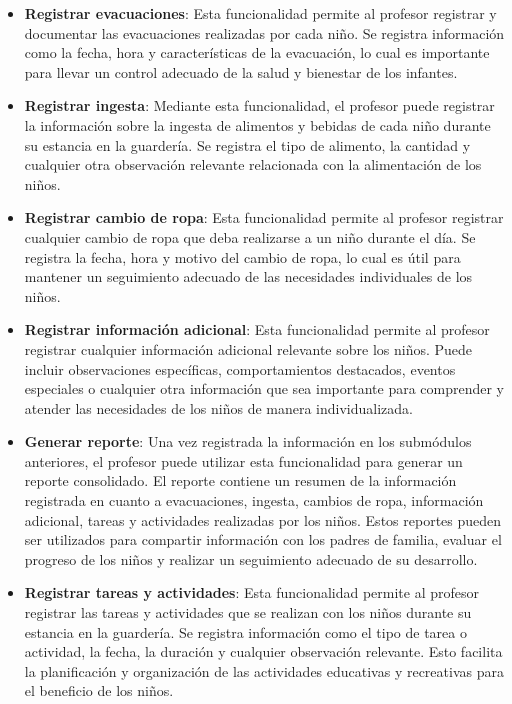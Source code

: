 \begin{itemize}
\item \textbf{Registrar evacuaciones}: Esta funcionalidad permite al profesor registrar y documentar las evacuaciones realizadas por cada niño. Se registra información como la fecha, hora y características de la evacuación, lo cual es importante para llevar un control adecuado de la salud y bienestar de los infantes.

\item \textbf{Registrar ingesta}: Mediante esta funcionalidad, el profesor puede registrar la información sobre la ingesta de alimentos y bebidas de cada niño durante su estancia en la guardería. Se registra el tipo de alimento, la cantidad y cualquier otra observación relevante relacionada con la alimentación de los niños.

\item \textbf{Registrar cambio de ropa}: Esta funcionalidad permite al profesor registrar cualquier cambio de ropa que deba realizarse a un niño durante el día. Se registra la fecha, hora y motivo del cambio de ropa, lo cual es útil para mantener un seguimiento adecuado de las necesidades individuales de los niños.

\item \textbf{Registrar información adicional}: Esta funcionalidad permite al profesor registrar cualquier información adicional relevante sobre los niños. Puede incluir observaciones específicas, comportamientos destacados, eventos especiales o cualquier otra información que sea importante para comprender y atender las necesidades de los niños de manera individualizada.

\item \textbf{Generar reporte}: Una vez registrada la información en los submódulos anteriores, el profesor puede utilizar esta funcionalidad para generar un reporte consolidado. El reporte contiene un resumen de la información registrada en cuanto a evacuaciones, ingesta, cambios de ropa, información adicional, tareas y actividades realizadas por los niños. Estos reportes pueden ser utilizados para compartir información con los padres de familia, evaluar el progreso de los niños y realizar un seguimiento adecuado de su desarrollo.

\item \textbf{Registrar tareas y actividades}: Esta funcionalidad permite al profesor registrar las tareas y actividades que se realizan con los niños durante su estancia en la guardería. Se registra información como el tipo de tarea o actividad, la fecha, la duración y cualquier observación relevante. Esto facilita la planificación y organización de las actividades educativas y recreativas para el beneficio de los niños.

\end{itemize}

